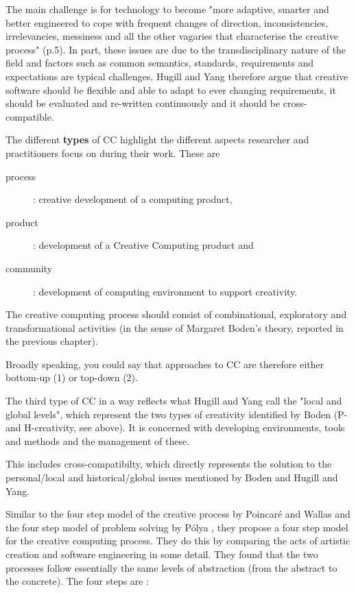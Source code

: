The main challenge is for technology  to become "more adaptive, smarter and better engineered to cope with frequent changes of direction, inconsistencies, irrelevancies, messiness and all the other vagaries that characterise the creative process" (p.5). In part, these issues are due to the transdisciplinary nature of the field and factors such as common semantics, standards, requirements and expectations are typical challenges. Hugill and Yang therefore argue that creative software should be flexible and able to adapt to ever changing requirements, it should be evaluated and re-written continuously and it should be cross-compatible.

The different \textbf{types} of CC highlight the different aspects researcher and practitioners focus on during their work. These are

\begin{description}
  \item [process]:  creative development of a computing product,
  \item [product]: development of a Creative Computing product and
  \item [community]: development of computing environment to support creativity.
\end{description}

The creative computing process should consist of combinational, exploratory and transformational activities (in the sense of Margaret Boden’s theory, reported in the previous chapter).

\begin{draft}
  Broadly speaking, you could say that approaches to CC are therefore either bottom-up (1) or top-down (2).
\end{draft}

The third type of CC in a way reflects what Hugill and Yang call the "local and global levels", which represent the two types of creativity identified by Boden (P- and H-creativity, see above). It is concerned with developing environments, tools and methods and the management of these.

\begin{draft}
  This includes cross-compatibilty, which directly represents the solution to the personal/local and historical/global issues mentioned by Boden and Hugill and Yang.
\end{draft}

Similar to the four step model of the creative process by Poincaré and Wallas \citep{Poincare2001, Wallas1926} and the four step model of problem solving by Pólya \citep{Polya1957}, they propose a four step model for the creative computing process. They do this by comparing the acts of artistic creation and software engineering in some detail. They found that the two processes follow essentially the same levels of abstraction (from the abstract to the concrete). The four steps are \citep[p.15]{Polya1957}:

